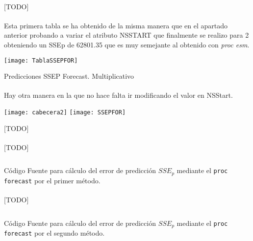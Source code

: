 \documentclass[a4paper, spanish]{article}
\begin{document}
    \paragraph{}
    [TODO]

    \paragraph{}
    Esta primera tabla se ha obtenido de la misma manera que en el apartado anterior probando a variar  el  atributo NSSTART que finalmente se realizo para 2 obteniendo un SSEp de 62801.35 que es muy semejante al obtenido con \textit{proc esm}.

    \begin{table}[htb!]
      \centering
      \texttt{[image: TablaSSEPFOR]}
      \caption{Predicciones SSEP Forecast. Multiplicativo}
      \label{}
    \end{table}

    \paragraph{}
    Hay otra manera en la que no hace falta ir modificando el valor en NSStart.

    \begin{table}[htb!]
      \centering
      \texttt{[image: cabecera2]}
      \texttt{[image: SSEPFOR]}
      \caption{[TODO]}
      \label{}
    \end{table}

    \paragraph{}
    [TODO]

    \begin{listing}[htb!]
      \centering
      \inputminted{SAS}{./res/code/e-prediction-forecast-method-1.sas}
      \caption{Código Fuente para cálculo del error de predicción $SSE_p$ mediante el \texttt{proc forecast} por el primer método.}
      \label{code:prediction_forecast_method_2}
    \end{listing}

    \paragraph{}
    [TODO]

    \begin{listing}[htb!]
      \centering
      \inputminted{SAS}{./res/code/e-prediction-forecast-method-2.sas}
      \caption{Código Fuente para cálculo del error de predicción $SSE_p$ mediante el \texttt{proc forecast} por el segundo método.}
      \label{code:prediction_forecast_method_2}
    \end{listing}
\end{document}

